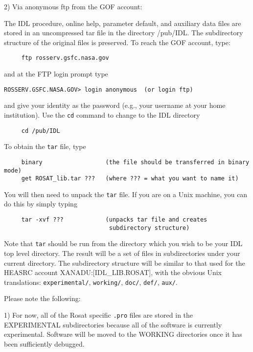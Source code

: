 2) Via anonymous ftp from the GOF account:
 
The IDL procedure, online help, parameter default, and auxiliary data
files are stored in an uncompressed tar file in the directory /pub/IDL.
The subdirectory structure of the original files is preserved. To reach
the GOF account, type:

\medskip\noindent
\begin{verbatim}
     ftp rosserv.gsfc.nasa.gov
\end{verbatim}
and at the FTP login prompt type

\medskip\noindent
\begin{verbatim}
ROSSERV.GSFC.NASA.GOV> login anonymous  (or login ftp)
\end{verbatim}
and give your identity as the password (e.g., your username at your home
institution).  Use the {\tt cd} command to change to the IDL directory

\medskip\noindent
\begin{verbatim}
     cd /pub/IDL
\end{verbatim}
To obtain the {\tt tar} file, type

\medskip\noindent
\begin{verbatim}
     binary                  (the file should be transferred in binary mode)
     get ROSAT_lib.tar ???   (where ??? = what you want to name it)
\end{verbatim}
You will then need to unpack the {\tt tar} file. If you are on a Unix
machine, you can do this by simply typing

\medskip\noindent
\begin{verbatim}
     tar -xvf ???            (unpacks tar file and creates
                              subdirectory structure)
\end{verbatim}
Note that {\tt tar} should be run from the directory which you wish to be your
IDL top level directory. The result will be a set of files in
subdirectories under your current directory. The subdirectory structure
will be similar to that used for the HEASRC account XANADU:[IDL{\_}LIB.ROSAT],
with the obvious Unix translations: {\tt experimental/}, {\tt working/}, {\tt doc/}, {\tt def/},
{\tt aux/}.
 
Please note the following:
 
1) For now, all of the Rosat specific {\tt .pro} files are stored in the
EXPERIMENTAL subdirectories because all of the software is currently
experimental. Software will be moved to the WORKING directories once it has
been sufficiently debugged.
 
